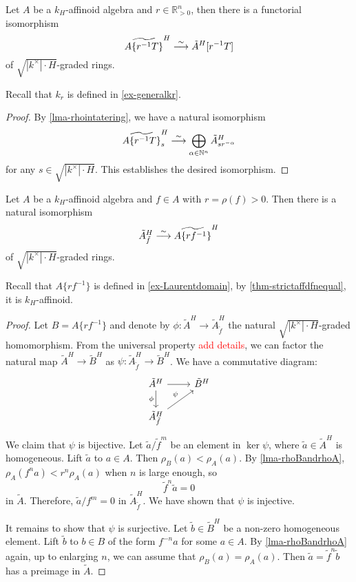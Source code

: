 \begin{proposition}\label{prop-gradedredtate}
    Let $A$ be a $k_H$-affinoid algebra and $r\in \mathbb{R}^n_{>0}$, then there is a functorial isomorphism
    \[
        \widetilde{A\{r^{-1}T\}}^H \stackrel{\sim}{\longrightarrow} \tilde{A}^H[r^{-1}T]
    \]
    of $\sqrt{|k^{\times}|\cdot H}$-graded rings.
\end{proposition}
Recall that $k_r$ is defined in \cref{ex-generalkr}.
\begin{proof}
    By \cref{lma-rhointatering}, we have a natural isomorphism
    \[
        \widetilde{A\{r^{-1}T\}}^H_s \stackrel{\sim}{\longrightarrow} \bigoplus_{\alpha\in \mathbb{N}^n} \tilde{A}^H_{s r^{-\alpha}}  
    \]
    for any $s\in \sqrt{|k^{\times}|\cdot H}$. This establishes the desired isomorphism.
\end{proof}

\begin{proposition}\label{prop:localatoneelementreduction}
    Let $A$ be a $k_H$-affinoid algebra and $f\in A$ with $r=\rho(f)>0$. Then there is a natural isomorphism
    \[
        \tilde{A}^H_{\tilde{f}}\stackrel{\sim}{\longrightarrow} \widetilde{A\{rf^{-1}\}}^H
    \]
    of $\sqrt{|k^{\times}|\cdot H}$-graded rings.
\end{proposition}
Recall that $A\{rf^{-1}\}$ is defined in \cref{ex-Laurentdomain}, by \cref{thm-strictaffdfnequal}, it is $k_H$-affinoid.
\begin{proof}

    Let $B=A\{rf^{-1}\}$ and denote by $\phi:\tilde{A}^H\rightarrow \tilde{A}_{\tilde{f}}^H$ the natural  $\sqrt{|k^{\times}|\cdot H}$-graded homomorphism. From the universal property \textcolor{red}{add details}, we can factor the natural map $\tilde{A}^H\rightarrow \tilde{B}^H$ as $\psi:\tilde{A}_{\tilde{f}}^H\rightarrow \tilde{B}^H$. We have a commutative diagram:
    \[
        \begin{tikzcd}
            \tilde{A}^H \arrow[r] \arrow[d, "\phi"']   & \tilde{B}^H \\
            \tilde{A}^H_{\tilde{f}} \arrow[ru, "\psi"] &          
        \end{tikzcd}
    \]
    We claim that $\psi$ is bijective.
    Let $\tilde{a}/\tilde{f}^m$ be an element in $\ker \psi$, where $\tilde{a}\in \tilde{A}^H$ is homogeneous. Lift $\tilde{a}$ to $a\in A$. Then $\rho_B(a)<\rho_A(a)$. By \cref{lma-rhoBandrhoA}, $\rho_A(f^na)<r^n\rho_A(a)$ when $n$ is large enough, so 
    \[
        \tilde{f}^n\tilde{a}=0  
    \]
    in $\tilde{A}$. Therefore, $\tilde{a}/f^m=0$ in $\tilde{A}^H_{\tilde{f}}$. We have shown that $\psi$ is injective.

    It remains to show that $\psi$ is surjective. Let $\tilde{b}\in \tilde{B}^H$ be a non-zero homogeneous element. Lift $\tilde{b}$ to $b\in B$ of the form $f^{-n}a$ for some $a\in A$. By \cref{lma-rhoBandrhoA} again, up to enlarging $n$, we can assume that $\rho_B(a)=\rho_A(a)$. Then $\tilde{a}=\tilde{f}^n\tilde{b}$ has a preimage in $\tilde{A}$. 

\end{proof}

